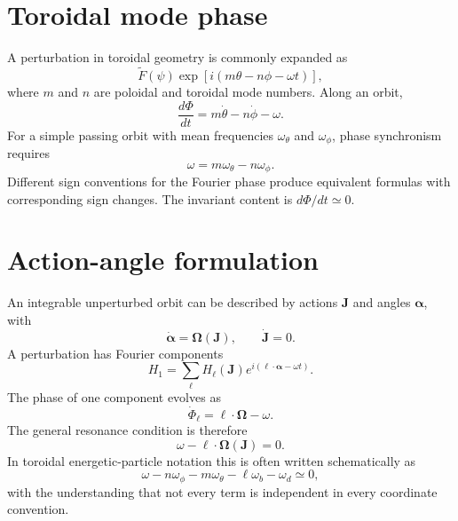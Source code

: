 \documentclass[11pt]{article}
\begin{document}
\section{Toroidal mode phase}
A perturbation in toroidal geometry is commonly expanded as
\begin{equation}
\widetilde F(\psi)\exp\!\left[i(m\theta-n\phi-\omega t)\right],
\end{equation}
where $m$ and $n$ are poloidal and toroidal mode numbers. Along an orbit,
\begin{equation}
\frac{d\Phi}{dt}=m\dot\theta-n\dot\phi-\omega.
\end{equation}
For a simple passing orbit with mean frequencies $\omega_\theta$ and $\omega_\phi$, phase synchronism requires
\begin{equation}
\boxed{\omega=m\omega_\theta-n\omega_\phi}.
\end{equation}
Different sign conventions for the Fourier phase produce equivalent formulas with corresponding sign changes. The invariant content is $d\Phi/dt\simeq0$.

\section{Action-angle formulation}
An integrable unperturbed orbit can be described by actions $\mathbf J$ and angles $\boldsymbol\alpha$, with
\begin{equation}
\dot{\boldsymbol\alpha}=\boldsymbol\Omega(\mathbf J),\qquad \dot{\mathbf J}=0.
\end{equation}
A perturbation has Fourier components
\begin{equation}
H_1=\sum_{\boldsymbol\ell} H_{\boldsymbol\ell}(\mathbf J)
 e^{i(\boldsymbol\ell\cdot\boldsymbol\alpha-\omega t)}.
\end{equation}
The phase of one component evolves as
\begin{equation}
\dot\Phi_{\boldsymbol\ell}=\boldsymbol\ell\cdot\boldsymbol\Omega-\omega.
\end{equation}
The general resonance condition is therefore
\begin{equation}
\boxed{\omega-\boldsymbol\ell\cdot\boldsymbol\Omega(\mathbf J)=0}.
\end{equation}
In toroidal energetic-particle notation this is often written schematically as
\begin{equation}
\boxed{\omega-n\omega_\phi-m\omega_\theta-\ell\omega_b-\omega_d\simeq0},
\end{equation}
with the understanding that not every term is independent in every coordinate convention.
\end{document}

